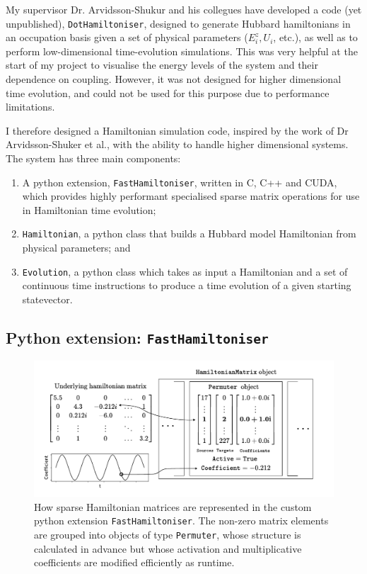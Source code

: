 \documentclass{report}
\begin{document}
My supervisor Dr. Arvidsson-Shukur and his collegues have developed a code (yet unpublished), \texttt{DotHamiltoniser}, designed to generate Hubbard hamiltonians in an occupation basis given a set of physical parameters ($E_i^z, U_i$, etc.), as well as to perform low-dimensional time-evolution simulations. This was very helpful at the start of my project to visualise the energy levels of the system and their dependence on coupling. However, it was not designed for higher dimensional time evolution, and could not be used for this purpose due to performance limitations.

I therefore designed a Hamiltonian simulation code, inspired by the work of Dr Arvidsson-Shuker et al., with the ability to handle higher dimensional systems. The system has three main components: 
\begin{enumerate}
    \item A python extension, \texttt{FastHamiltoniser}, written in C, C++ and CUDA, which provides highly performant specialised sparse matrix operations for use in Hamiltonian time evolution;
    \item \texttt{Hamiltonian}, a python class that builds a Hubbard model Hamiltonian from physical parameters; and
    \item \texttt{Evolution}, a python class which takes as input a Hamiltonian and a set of continuous time instructions to produce a time evolution of a given starting statevector.
\end{enumerate}
\subsection{Python extension: \texttt{FastHamiltoniser}}
\begin{figure}[ht]
    \centering
    \includegraphics[scale = 0.8]{Figures/fasthamiltoniser/diagram.pdf}
    \caption{How sparse Hamiltonian matrices are represented in the custom python extension \texttt{FastHamiltoniser}. The non-zero matrix elements are grouped into objects of type \texttt{Permuter}, whose structure is calculated in advance but whose activation and multiplicative coefficients are modified efficiently as runtime.}
    \label{fig:fasthamiltoniser}
\end{figure}
\end{document}
